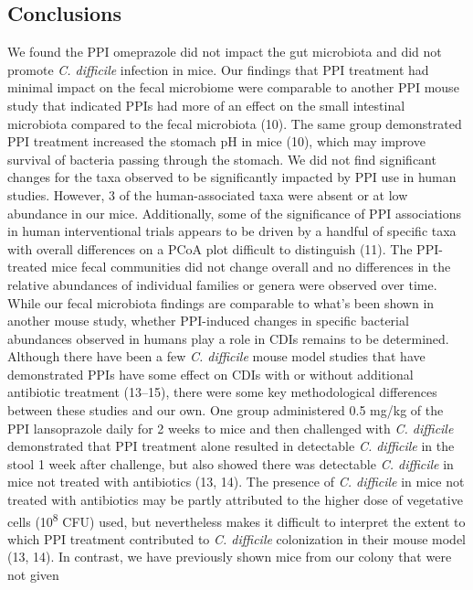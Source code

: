 \documentclass[11pt,]{article}
\begin{document}
\subsection{Conclusions}\label{conclusions}

We found the PPI omeprazole did not impact the gut microbiota and did
not promote \emph{C. difficile} infection in mice. Our findings that PPI
treatment had minimal impact on the fecal microbiome were comparable to
another PPI mouse study that indicated PPIs had more of an effect on the
small intestinal microbiota compared to the fecal microbiota (10). The
same group demonstrated PPI treatment increased the stomach pH in mice
(10), which may improve survival of bacteria passing through the
stomach. We did not find significant changes for the taxa observed to be
significantly impacted by PPI use in human studies. However, 3 of the
human-associated taxa were absent or at low abundance in our mice.
Additionally, some of the significance of PPI associations in human
interventional trials appears to be driven by a handful of specific taxa
with overall differences on a PCoA plot difficult to distinguish (11).
The PPI-treated mice fecal communities did not change overall and no
differences in the relative abundances of individual families or genera
were observed over time. While our fecal microbiota findings are
comparable to what's been shown in another mouse study, whether
PPI-induced changes in specific bacterial abundances observed in humans
play a role in CDIs remains to be determined.\\
Although there have been a few \emph{C. difficile} mouse model studies
that have demonstrated PPIs have some effect on CDIs with or without
additional antibiotic treatment (13--15), there were some key
methodological differences between these studies and our own. One group
administered 0.5 mg/kg of the PPI lansoprazole daily for 2 weeks to mice
and then challenged with \emph{C. difficile} demonstrated that PPI
treatment alone resulted in detectable \emph{C. difficile} in the stool
1 week after challenge, but also showed there was detectable \emph{C.
difficile} in mice not treated with antibiotics (13, 14). The presence
of \emph{C. difficile} in mice not treated with antibiotics may be
partly attributed to the higher dose of vegetative cells
(10\textsuperscript{8} CFU) used, but nevertheless makes it difficult to
interpret the extent to which PPI treatment contributed to \emph{C.
difficile} colonization in their mouse model (13, 14). In contrast, we
have previously shown mice from our colony that were not given
\end{document}
